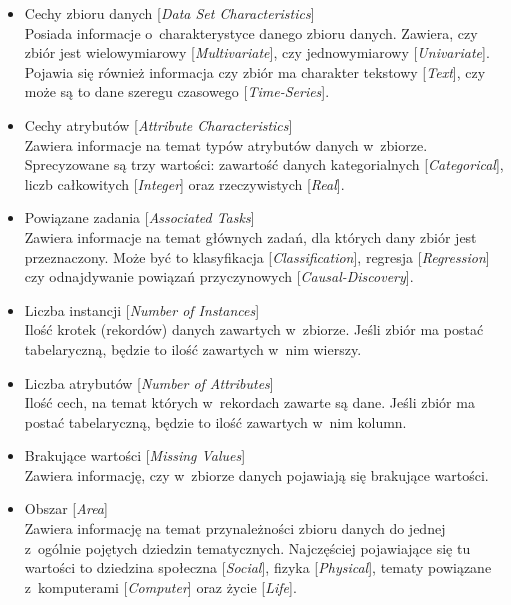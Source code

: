 \begin{itemize}
  \item Cechy zbioru danych [\emph{Data Set Characteristics}] \\
        Posiada informacje o~charakterystyce danego zbioru danych.
        Zawiera, czy zbiór jest wielowymiarowy [\emph{Multivariate}], czy jednowymiarowy [\emph{Univariate}]\footnotemark.
        Pojawia się również informacja czy zbiór ma charakter tekstowy [\emph{Text}], czy może są to dane szeregu czasowego [\emph{Time-Series}].

  \item Cechy atrybutów [\emph{Attribute Characteristics}] \\
        Zawiera informacje na temat typów atrybutów danych w~zbiorze.
        Sprecyzowane są trzy wartości: zawartość danych kategorialnych [\emph{Categorical}], liczb całkowitych [\emph{Integer}] oraz rzeczywistych [\emph{Real}].

  \item Powiązane zadania [\emph{Associated Tasks}] \\
        Zawiera informacje na temat głównych zadań, dla których dany zbiór jest przeznaczony.
        Może być to klasyfikacja [\emph{Classification}], regresja [\emph{Regression}] czy odnajdywanie powiązań przyczynowych [\emph{Causal-Discovery}].

  \item Liczba instancji [\emph{Number of Instances}] \\
        Ilość krotek (rekordów) danych zawartych w~zbiorze.
        Jeśli zbiór ma postać tabelaryczną, będzie to ilość zawartych w~nim wierszy.

  \item Liczba atrybutów [\emph{Number of Attributes}] \\
        Ilość cech, na temat których w~rekordach zawarte są dane.
        Jeśli zbiór ma postać tabelaryczną, będzie to ilość zawartych w~nim kolumn.

  \item Brakujące wartości [\emph{Missing Values}] \\
        Zawiera informację, czy w~zbiorze danych pojawiają się brakujące wartości.

  \item Obszar [\emph{Area}] \\
        Zawiera informację na temat przynależności zbioru danych do jednej z~ogólnie pojętych dziedzin tematycznych.
        Najczęściej pojawiające się tu wartości to dziedzina społeczna [\emph{Social}], fizyka [\emph{Physical}], tematy powiązane z~komputerami [\emph{Computer}] oraz życie [\emph{Life}].


\end{itemize}
